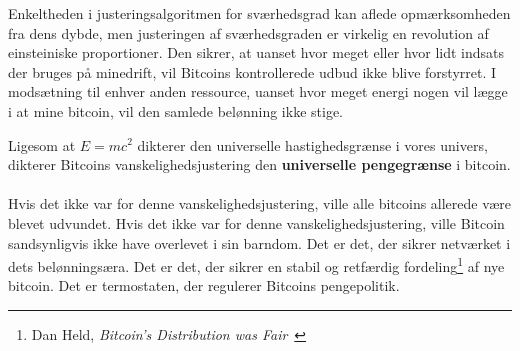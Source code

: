 \documentclass[paper=6in:9in,pagesize=pdftex,headinclude=on,footinclude=on,12pt]{scrbook}
\begin{document}
Enkeltheden i justeringsalgoritmen for sværhedsgrad kan aflede opmærksomheden fra dens dybde, men justeringen af sværhedsgraden er virkelig en revolution af einsteiniske proportioner. Den sikrer, at uanset hvor meget eller hvor lidt indsats der bruges på minedrift, vil Bitcoins kontrollerede udbud ikke blive forstyrret. I modsætning til enhver anden ressource, uanset hvor meget energi nogen vil lægge i at mine bitcoin, vil den samlede belønning ikke stige.

Ligesom at $E=mc^2$ dikterer den universelle hastighedsgrænse i vores univers, dikterer Bitcoins vanskelighedsjustering den \textbf{universelle pengegrænse} i bitcoin.\paragraph{} Hvis det ikke var for denne vanskelighedsjustering, ville alle bitcoins allerede være blevet udvundet. Hvis det ikke var for denne vanskelighedsjustering, ville Bitcoin sandsynligvis ikke have overlevet i sin barndom. Det er det, der sikrer netværket i dets belønningsæra. Det er det, der sikrer en stabil og retfærdig fordeling\footnote{Dan Held, \textit{Bitcoin's Distribution was Fair}~\cite{distribution-was-fair}} af nye bitcoin. Det er termostaten, der regulerer Bitcoins pengepolitik.
\end{document}
